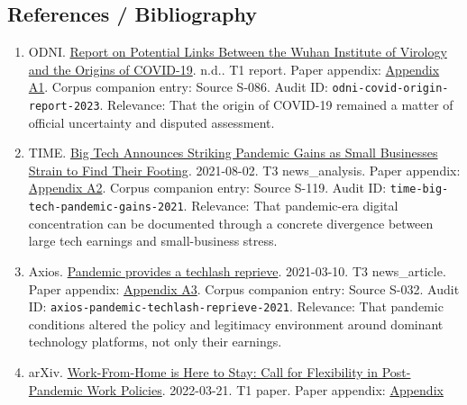 \documentclass[
  american,
  11pt,
  letterpaper,
]{article}
\providecommand{\tightlist}{%
  \setlength{\itemsep}{0pt}\setlength{\parskip}{0pt}}
\begin{document}
\subsection{References / Bibliography}\label{references-bibliography-3}

\begin{enumerate}
\def\labelenumi{\arabic{enumi}.}
\tightlist
\item
  ODNI.
  \href{https://www.dni.gov/files/ODNI/documents/assessments/Report-on-Potential-Links-Between-the-Wuhan-Institute-of-Virology-and-the-Origins-of-COVID-19-20230623.pdf}{Report
  on Potential Links Between the Wuhan Institute of Virology and the
  Origins of COVID-19}. n.d.. T1 report. Paper appendix:
  \hyperref[ch-03-appendix-a1-report-on-potential-links-between-the-wuhan-institute-of-virology-and-the-origins-of-covid-19]{Appendix
  A1}. Corpus companion entry: Source S-086. Audit ID:
  \texttt{odni-covid-origin-report-2023}. Relevance: That the origin of
  COVID-19 remained a matter of official uncertainty and disputed
  assessment.
\item
  TIME.
  \href{https://time.com/6085674/big-tech-apple-microsoft-facebook-amazon-google-earnings/}{Big
  Tech Announces Striking Pandemic Gains as Small Businesses Strain to
  Find Their Footing}. 2021-08-02. T3 news\_analysis. Paper appendix:
  \hyperref[ch-03-appendix-a2-big-tech-announces-striking-pandemic-gains-as-small-businesses-strain-to-find-their-footing]{Appendix
  A2}. Corpus companion entry: Source S-119. Audit ID:
  \texttt{time-big-tech-pandemic-gains-2021}. Relevance: That
  pandemic-era digital concentration can be documented through a
  concrete divergence between large tech earnings and small-business
  stress.
\item
  Axios.
  \href{https://www.axios.com/2021/03/10/pandemic-provides-techlash-reprieve}{Pandemic
  provides a techlash reprieve}. 2021-03-10. T3 news\_article. Paper
  appendix:
  \hyperref[ch-03-appendix-a3-pandemic-provides-a-techlash-reprieve]{Appendix
  A3}. Corpus companion entry: Source S-032. Audit ID:
  \texttt{axios-pandemic-techlash-reprieve-2021}. Relevance: That
  pandemic conditions altered the policy and legitimacy environment
  around dominant technology platforms, not only their earnings.
\item
  arXiv. \href{https://arxiv.org/abs/2203.11136}{Work-From-Home is Here
  to Stay: Call for Flexibility in Post-Pandemic Work Policies}.
  2022-03-21. T1 paper. Paper appendix:
  \hyperref[ch-03-appendix-a4-work-from-home-is-here-to-stay-call-for-flexibility-in-post-pandemic-work-policies]{Appendix
}
\end{enumerate}
\end{document}
